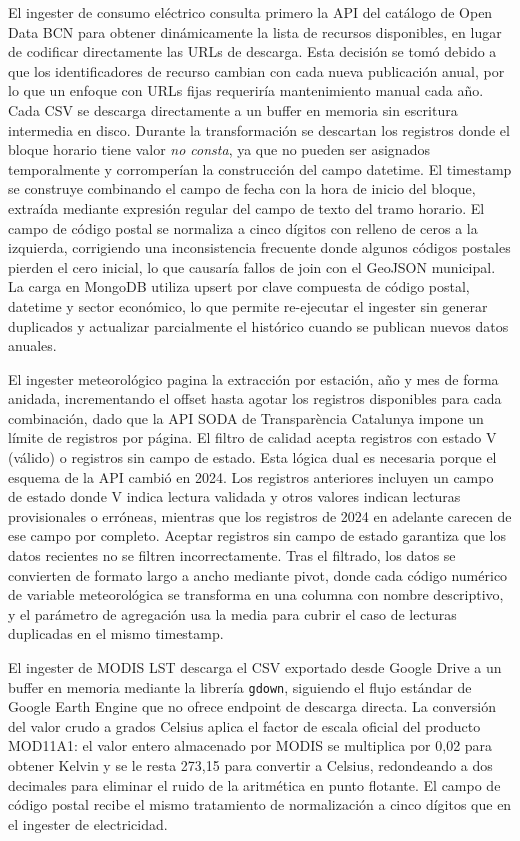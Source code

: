 \documentclass[12pt, a4paper]{article}
\begin{document}
El ingester de consumo eléctrico consulta primero la API del catálogo de Open Data BCN para obtener dinámicamente la lista de recursos disponibles, en lugar de codificar directamente las URLs de descarga. Esta decisión se tomó debido a que los identificadores de recurso cambian con cada nueva publicación anual, por lo que un enfoque con URLs fijas requeriría mantenimiento manual cada año. Cada CSV se descarga directamente a un buffer en memoria sin escritura intermedia en disco. Durante la transformación se descartan los registros donde el bloque horario tiene valor \textit{no consta}, ya que no pueden ser asignados temporalmente y corromperían la construcción del campo datetime. El timestamp se construye combinando el campo de fecha con la hora de inicio del bloque, extraída mediante expresión regular del campo de texto del tramo horario. El campo de código postal se normaliza a cinco dígitos con relleno de ceros a la izquierda, corrigiendo una inconsistencia frecuente donde algunos códigos postales pierden el cero inicial, lo que causaría fallos de join con el GeoJSON municipal. La carga en MongoDB utiliza upsert por clave compuesta de código postal, datetime y sector económico, lo que permite re-ejecutar el ingester sin generar duplicados y actualizar parcialmente el histórico cuando se publican nuevos datos anuales.

El ingester meteorológico pagina la extracción por estación, año y mes de forma anidada, incrementando el offset hasta agotar los registros disponibles para cada combinación, dado que la API SODA de Transparència Catalunya impone un límite de registros por página. El filtro de calidad acepta registros con estado V (válido) o registros sin campo de estado. Esta lógica dual es necesaria porque el esquema de la API cambió en 2024. Los registros anteriores incluyen un campo de estado donde V indica lectura validada y otros valores indican lecturas provisionales o erróneas, mientras que los registros de 2024 en adelante carecen de ese campo por completo. Aceptar registros sin campo de estado garantiza que los datos recientes no se filtren incorrectamente. Tras el filtrado, los datos se convierten de formato largo a ancho mediante pivot, donde cada código numérico de variable meteorológica se transforma en una columna con nombre descriptivo, y el parámetro de agregación usa la media para cubrir el caso de lecturas duplicadas en el mismo timestamp.

El ingester de MODIS LST descarga el CSV exportado desde Google Drive a un buffer en memoria mediante la librería \texttt{gdown}, siguiendo el flujo estándar de Google Earth Engine que no ofrece endpoint de descarga directa. La conversión del valor crudo a grados Celsius aplica el factor de escala oficial del producto MOD11A1: el valor entero almacenado por MODIS se multiplica por 0,02 para obtener Kelvin y se le resta 273,15 para convertir a Celsius, redondeando a dos decimales para eliminar el ruido de la aritmética en punto flotante. El campo de código postal recibe el mismo tratamiento de normalización a cinco dígitos que en el ingester de electricidad.
\end{document}
